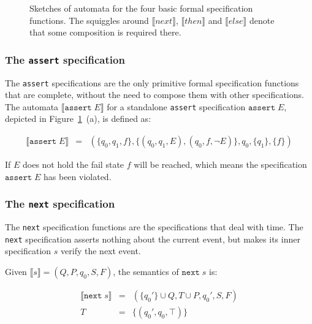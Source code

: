 \begin{figure}[h!]
  \caption{Sketches of automata for the four basic formal specification
    functions. The squiggles around $\llbracket next \rrbracket$, $\llbracket then \rrbracket$ and $\llbracket else \rrbracket$ denote
    that some composition is required there.}
	\label{figure-basic-formal-specification-automata}
\end{figure}


\subsubsection{The \texttt{assert} specification}

The \texttt{assert} specifications are the only primitive formal specification
functions that are complete, without the need to compose them with other
specifications. The automata $\llbracket \texttt{assert} \; E \rrbracket$ for a
standalone \texttt{assert} specification $\texttt{assert} \; E$, depicted in
Figure~\ref{figure-basic-formal-specification-automata}~(a), is defined as:

\medskip
\[
  \begin{array}{rcl}
    \llbracket \texttt{assert} \; E \rrbracket & = & (\{q_0, q_1, f\}, \{(q_0, q_1, E), (q_0, f, \neg E)\}, q_0, \{q_1\}, \{f\})
  \end{array}
\]
\medskip

If $E$ does not hold the fail state $f$ will be reached, which means the
specification $\texttt{assert} \; E$ has been violated.


\subsubsection{The \texttt{next} specification}

The \texttt{next} specification functions are the specifications that deal with
time. The \texttt{next} specification asserts nothing about the current event,
but makes its inner specification $s$ verify the next event.

Given $\llbracket s \rrbracket = (Q, P, q_0, S, F)$, the semantics of
$\texttt{next} \; s$ is:

\medskip
\[
  \begin{array}{rcl}
    \llbracket \texttt{next} \; s \rrbracket & = & (\{q_0'\} \cup Q, T \cup P, q_0', S, F) \\
               T  & = & \{(q_0', q_0, \top)\}
  \end{array}
\]
\medskip


